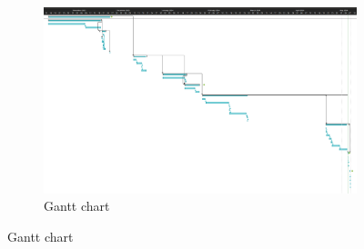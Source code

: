 \begin{figure}
    \begin{subfigure}[b]{1.0\textwidth}
        \vspace{10px}
        \caption{Gantt chart}
        \label{fig:GanttChart}
        \includegraphics[width=1.0\textwidth, height=0.3\textheight]{Figures/GanttChart.png}
    \end{subfigure}
\end{figure}

